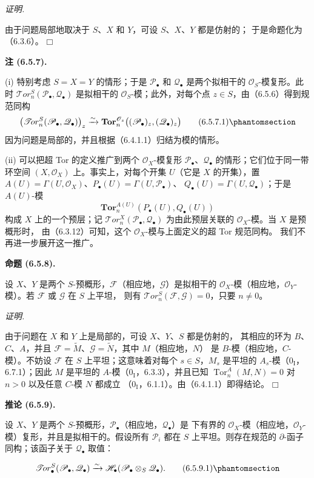 \documentclass[UTF8,fontset=none,11pt,oneside,openany]{ctexbook}
\providecommand{\square}{\mdlgwhtsquare}
\newenvironment{proposition}[1][]{%
  \par\medskip\noindent\textbf{命题 (#1).}\ %
}{\par}
\newenvironment{proof}{%
  \par\smallskip\noindent\textit{证明.}\ %
}{\hfill$\square$\par}
\newcommand{\oldpage}[2][]{%
  \hypertarget{ega-source-page-#1-#2}{}%
  \marginnote{\scriptsize\textbf{#1}~|~#2}\ignorespaces}
\let\EGAOriginalLabel\label
\renewcommand{\label}[1]{\phantomsection\EGAOriginalLabel{#1}}
\newenvironment{namedtheorem}[2][]{%
  \par\medskip\noindent\textbf{#2 (#1).}\ %
}{\par}
\begin{document}
\begin{proof}
由于问题局部地取决于 $S$、$X$ 和 $Y$，可设 $S$、$X$、$Y$ 都是仿射的；
于是命题化为（6.3.6）。
\end{proof}
\begin{namedtheorem}[6.5.7]{注}
\textnormal{(i)} 特别考虑 $S=X=Y$ 的情形；于是 $\mathscr P_\bullet$ 和
$\mathscr Q_\bullet$ 是两个拟相干的 $\mathscr O_S$-模复形。此时
$\mathscr{T}\!or_n^S(\mathscr P_\bullet,\mathscr Q_\bullet)$ 是拟相干的
$\mathscr O_S$-模；此外，对每个点 $z\in S$，由（6.5.6）得到规范同构
\[
  \bigl(\mathscr{T}\!or_n^S
    (\mathscr P_\bullet,\mathscr Q_\bullet)\bigr)_z
  \xrightarrow{\sim}
  \mathbf{Tor}_n^{\mathscr O_z}
  \bigl((\mathscr P_\bullet)_z,(\mathscr Q_\bullet)_z\bigr)
  \tag{6.5.7.1}\label{III.6.5.7.1-fr}
\]
因为问题是局部的，并且根据（6.4.1.1）归结为模的情形。

\textnormal{(ii)} 可以把超 Tor 的定义推广到两个 $\mathscr O_X$-模复形
$\mathscr P_\bullet$、$\mathscr Q_\bullet$ 的情形；它们位于同一带环空间
$(X,\mathscr O_X)$ 上。事实上，对每个开集 $U$（它是 $X$ 的开集），置
$A(U)=\Gamma(U,\mathscr O_X)$、$P_\bullet(U)=\Gamma(U,\mathscr P_\bullet)$、
$Q_\bullet(U)=\Gamma(U,\mathscr Q_\bullet)$；于是 $A(U)$-模
\[
  \mathbf{Tor}_n^{A(U)}(P_\bullet(U),Q_\bullet(U))
\]
构成 $X$ 上的一个预层；记
$\mathscr{T}\!or_n^X(\mathscr P_\bullet,\mathscr Q_\bullet)$ 为由此预层关联的
$\mathscr O_X$-模。当 $X$ 是预概形时，
由（6.3.12）可知，这个 $\mathscr O_X$-模与上面定义的超 Tor 规范同构。
我们不再进一步展开这一推广。
\end{namedtheorem}
\begin{proposition}[6.5.8]
设 $X$、$Y$ 是两个 $S$-预概形，$\mathscr F$（相应地，$\mathscr G$）是拟相干的
$\mathscr O_X$-模（相应地，$\mathscr O_Y$-模）。若 $\mathscr F$ 或 $\mathscr G$ 在 $S$ 上平坦，
则有 $\mathscr{T}\!or_n^S(\mathscr F,\mathscr G)=0$，只要 $n\neq0$。
\end{proposition}

\begin{proof}
由于问题在 $X$ 和 $Y$ 上是局部的，可设 $X$、$Y$、$S$ 都是仿射的，
其相应的环为 $B$、$C$、$A$，并且
$\mathscr F=\widetilde M$、$\mathscr G=\widetilde N$，其中 $M$（相应地，$N$）
是 $B$-模（相应地，$C$-模）。不妨设 $\mathscr F$ 在 $S$ 上平坦；这意味着对每个
$s\in S$，$M_s$ 是平坦的 $A_s$-模（$0_{\mathrm I}$，6.7.1）；因此 $M$ 是平坦的
$A$-模（$0_{\mathrm I}$，6.3.3），并且已知
$\operatorname{Tor}_n^A(M,N)=0$ 对 $n>0$ 以及任意 $C$-模 $N$ 都成立
（$0_{\mathrm I}$，6.1.1）。由（6.4.1.1）即得结论。
\end{proof}
\begin{namedtheorem}[6.5.9]{推论}
设 $X$、$Y$ 是两个 $S$-预概形，$\mathscr P_\bullet$（相应地，$\mathscr Q_\bullet$）是
下有界的 $\mathscr O_X$-模（相应地，$\mathscr O_Y$-模）复形，并且是拟相干的。假设所有
$\mathscr P_i$ 都在 $S$ 上平坦。则存在规范的 $\partial$-函子同构；该函子关于
$\mathscr Q_\bullet$ 取值：

\oldpage[III]{151}
\[
  \mathscr{T}\!or_\bullet^S(\mathscr P_\bullet,\mathscr Q_\bullet)
  \xrightarrow{\sim}
  \mathscr H_\bullet(\mathscr P_\bullet\otimes_S\mathscr Q_\bullet).
  \tag{6.5.9.1}\label{III.6.5.9.1-fr}
\]
\end{namedtheorem}
\end{document}
